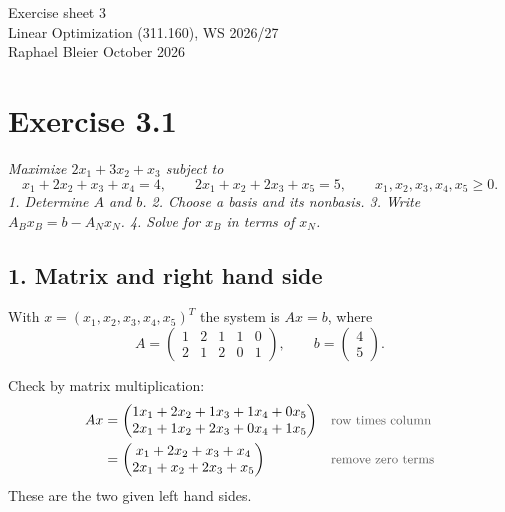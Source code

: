 \documentclass[a4paper,11pt]{article}
\newif\ifexplain
\newcommand{\aufgabe}[1]{\section*{Exercise #1}}
\newcommand{\angabe}[1]{\textit{#1}\par\smallskip}
\newcommand{\teil}[1]{\subsection*{#1}}
\newcommand{\why}[1]{\text{\small\color{black!65}#1}}
\newcommand{\explain}[1]{\ifexplain\begin{erklbox}#1\end{erklbox}\fi}
\begin{document}
\begin{center}
{\Large Exercise sheet 3}\\
Linear Optimization (311.160), WS 2026/27\\
Raphael Bleier  October 2026
\end{center}

\explain{Wir schreiben das LP als Gleichungssystem mit nichtnegativen Variablen. Eine Schlupfvariable misst dabei, wie viel bis zur jeweiligen Schranke fehlt. Die Basisvariablen stehen links; die Nichtbasisvariablen wählen wir rechts. Für eine Basislösung setzen wir alle Nichtbasisvariablen auf null. Zulässig ist diese Lösung erst, wenn auch die Basisvariablen nichtnegativ sind. Die Aufteilung und der Variablentausch folgen der Dictionary-Schreibweise aus Lecture 3, Abschnitt 2.2.}

\aufgabe{3.1}
\angabe{Maximize $2x_1+3x_2+x_3$ subject to
\[
x_1+2x_2+x_3+x_4=4,\qquad
2x_1+x_2+2x_3+x_5=5,\qquad x_1,x_2,x_3,x_4,x_5\geq0.
\]
1. Determine $A$ and $b$. 2. Choose a basis and its nonbasis.
3. Write $A_Bx_B=b-A_Nx_N$. 4. Solve for $x_B$ in terms of $x_N$.}

\teil{1. Matrix and right hand side}
With $x=(x_1,x_2,x_3,x_4,x_5)^T$ the system is $Ax=b$, where
\[
\boxed{A=\begin{pmatrix}1&2&1&1&0\\2&1&2&0&1\end{pmatrix},\qquad
b=\begin{pmatrix}4\\5\end{pmatrix}.}
\]
\explain{Jede Zeile steht für eine Nebenbedingung. Die Spalten folgen genau der Reihenfolge im Vektor $x$. Fehlt eine Variable in einer Gleichung, tragen wir dort null ein. Die Zielfunktionskoeffizienten gehören nicht in $A$. Zum Prüfen lesen wir eine Zeile der Matrix noch einmal als Gleichung, weil dabei sowohl eine vertauschte Spalte als auch ein fehlender Koeffizient auffällt, bevor wir mit der Basis weiterrechnen.}
Check by matrix multiplication:
\begin{align*}
Ax&=\begin{pmatrix}1x_1+2x_2+1x_3+1x_4+0x_5\cr2x_1+1x_2+2x_3+0x_4+1x_5\end{pmatrix}&&\why{row times column}\\
&=\begin{pmatrix}x_1+2x_2+x_3+x_4\cr2x_1+x_2+2x_3+x_5\end{pmatrix}&&\why{remove zero terms}
\end{align*}
These are the two given left hand sides.
\end{document}

